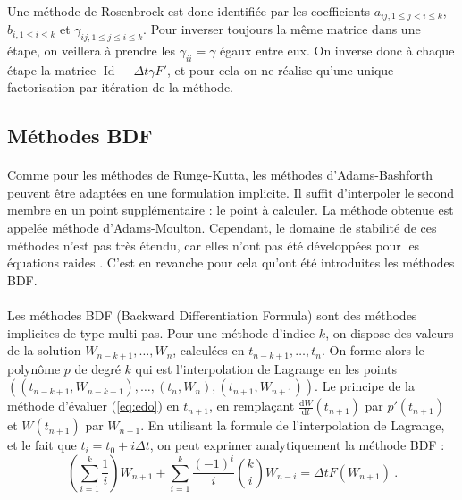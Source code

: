       \paragraph{}
      Une méthode de Rosenbrock est donc identifiée par les coefficients $a_{ij, 1\leq j<i\leq k}$, $b_{i, 1\leq i\leq k}$ et $\gamma_{ij, 1\leq j\leq i\leq k}$.
      Pour inverser toujours la même matrice dans une étape, on veillera à prendre les $\gamma_{ii} = \gamma$ égaux entre eux.
      On inverse donc à chaque étape la matrice $\operatorname{Id} - \Delta t\gamma F'$, et pour cela on ne réalise qu'une unique factorisation par itération de la méthode.


  \subsection{Méthodes BDF}

    \paragraph{}
    Comme pour les méthodes de Runge-Kutta, les méthodes d'Adams-Bashforth peuvent être adaptées en une formulation implicite.
    Il suffit d'interpoler le second membre en un point supplémentaire : le point à calculer.
    La méthode obtenue est appelée méthode d'Adams-Moulton.
    Cependant, le domaine de stabilité de ces méthodes n'est pas très étendu, car elles n'ont pas été développées pour les équations raides \cite{Iserles2008}.
    C'est en revanche pour cela qu'ont été introduites les méthodes BDF.

    \paragraph{}
    Les méthodes BDF (Backward Differentiation Formula) sont des méthodes implicites de type multi-pas.
    Pour une méthode d'indice $k$, on dispose des valeurs de la solution $W_{n-k+1}, \dots, W_n$, calculées en $t_{n-k+1}, \dots, t_n$.
    On forme alors le polynôme $p$ de degré $k$ qui est l'interpolation de Lagrange en les points $\left(\left(t_{n-k+1}, W_{n-k+1}\right), \dots, \left(t_n, W_n\right), \left(t_{n+1}, W_{n+1}\right)\right)$.
    Le principe de la méthode d'évaluer (\ref{eq:edo}) en $t_{n+1}$, en remplaçant $\frac{\mathrm{d}W}{\mathrm{d}t}\left(t_{n+1}\right)$ par $p'\left(t_{n+1}\right)$ et $W\left(t_{n+1}\right)$ par $W_{n+1}$.
    En utilisant la formule de l'interpolation de Lagrange, et le fait que $t_i = t_0 + i\Delta t$, on peut exprimer analytiquement la méthode BDF :
    \[\left(\sum_{i=1}^k\frac{1}{i}\right)W_{n+1} + \sum_{i=1}^k\frac{\left(-1\right)^i}{i}\binom{k}{i}W_{n-i} = \Delta tF\left(W_{n+1}\right)\ .\]

